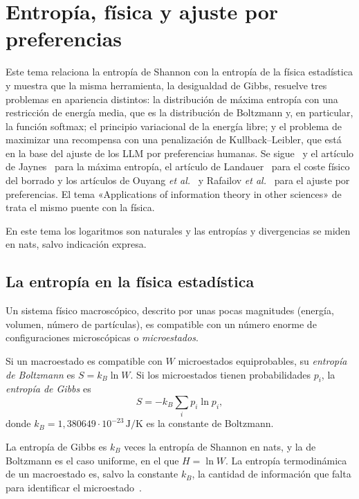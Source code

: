 \chapter{Entropía, física y ajuste por preferencias}
\label{tema:5}

Este tema relaciona la entropía de Shannon con la entropía de la física estadística y muestra que la misma herramienta, la desigualdad de Gibbs, resuelve tres problemas en apariencia distintos: la distribución de máxima entropía con una restricción de energía media, que es la distribución de Boltzmann y, en particular, la función softmax; el principio variacional de la energía libre; y el problema de maximizar una recompensa con una penalización de Kullback--Leibler, que está en la base del ajuste de los LLM por preferencias humanas. Se sigue~\cite[cap.~12]{ct} y el artículo de Jaynes~\cite{jaynes} para la máxima entropía, el artículo de Landauer~\cite{landauer} para el coste físico del borrado y los artículos de Ouyang \emph{et al.}~\cite{instructgpt} y Rafailov \emph{et al.}~\cite{dpo} para el ajuste por preferencias. El tema «Applications of information theory in other sciences» de~\cite{camit} trata el mismo puente con la física.

En este tema los logaritmos son naturales y las entropías y divergencias se miden en nats, salvo indicación expresa.

\section{La entropía en la física estadística}

Un sistema físico macroscópico, descrito por unas pocas magnitudes (energía, volumen, número de partículas), es compatible con un número enorme de configuraciones microscópicas o \emph{microestados}.

\begin{definicion}\label{def:boltzmann}
Si un macroestado es compatible con $W$ microestados equiprobables, su \emph{entropía de Boltzmann} es $S=k_B\ln W$. Si los microestados tienen probabilidades $p_i$, la \emph{entropía de Gibbs} es
\[
S=-k_B\sum_ip_i\ln p_i,
\]
donde $k_B=1{,}380649\cdot10^{-23}\,\mathrm{J/K}$ es la constante de Boltzmann.
\end{definicion}

La entropía de Gibbs es $k_B$ veces la entropía de Shannon en nats, y la de Boltzmann es el caso uniforme, en el que $H=\ln W$. La entropía termodinámica de un macroestado es, salvo la constante $k_B$, la cantidad de información que falta para identificar el microestado~\cite{jaynes}.

